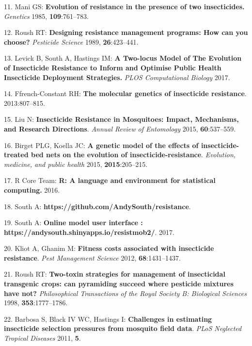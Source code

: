 \documentclass[11pt,]{article}
\begin{document}
\hypertarget{ref-Mani1985}{}
11. Mani GS: \textbf{Evolution of resistance in the presence of two
insecticides.} \emph{Genetics} 1985, \textbf{109}:761--783.

\hypertarget{ref-Roush1989}{}
12. Roush RT: \textbf{Designing resistance management programs: How can
you choose?} \emph{Pesticide Science} 1989, \textbf{26}:423--441.

\hypertarget{ref-Levick2017}{}
13. Levick B, South A, Hastings IM: \textbf{A Two-locus Model of The
Evolution of Insecticide Resistance to Inform and Optimise Public Health
Insecticide Deployment Strategies.} \emph{PLOS Computational Biology}
2017.

\hypertarget{ref-Ffrench-Constant2013}{}
14. Ffrench-Constant RH: \textbf{The molecular genetics of insecticide
resistance}. 2013:807--815.

\hypertarget{ref-Liu2015}{}
15. Liu N: \textbf{Insecticide Resistance in Mosquitoes: Impact,
Mechanisms, and Research Directions}. \emph{Annual Review of Entomology}
2015, \textbf{60}:537--559.

\hypertarget{ref-Birget2015}{}
16. Birget PLG, Koella JC: \textbf{A genetic model of the effects of
insecticide-treated bed nets on the evolution of
insecticide-resistance}. \emph{Evolution, medicine, and public health}
2015, \textbf{2015}:205--215.

\hypertarget{ref-RCoreTeam2016}{}
17. R Core Team: \textbf{R: A language and environment for statistical
computing.} 2016.

\hypertarget{ref-South2017}{}
18. South A: \textbf{https://github.com/AndySouth/resistance}.

\hypertarget{ref-South2017a}{}
19. South A: \textbf{Online model user interface :
https://andysouth.shinyapps.io/resistmob2/}. 2017.

\hypertarget{ref-Kliot2012}{}
20. Kliot A, Ghanim M: \textbf{Fitness costs associated with insecticide
resistance}. \emph{Pest Management Science} 2012,
\textbf{68}:1431--1437.

\hypertarget{ref-Roush1998}{}
21. Roush RT: \textbf{Two-toxin strategies for management of
insecticidal transgenic crops: can pyramiding succeed where pesticide
mixtures have not?} \emph{Philosophical Transactions of the Royal
Society B: Biological Sciences} 1998, \textbf{353}:1777--1786.

\hypertarget{ref-Barbosa2011}{}
22. Barbosa S, Black IV WC, Hastings I: \textbf{Challenges in estimating
insecticide selection pressures from mosquito field data}. \emph{PLoS
Neglected Tropical Diseases} 2011, \textbf{5}.
\end{document}
